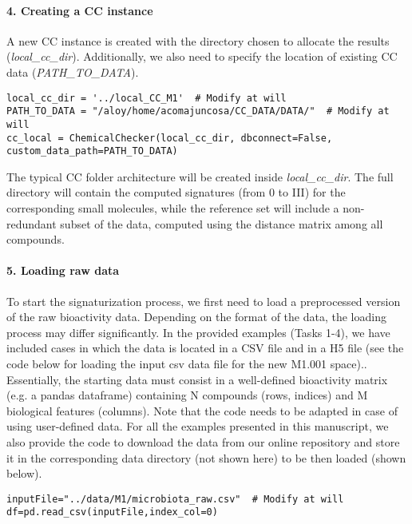 \paragraph{4. Creating a CC instance} \leavevmode

A new CC instance is created with the directory chosen to allocate the results (\textit{local\_cc\_dir}). Additionally, we also need to specify the location of existing CC data (\textit{PATH\_TO\_DATA}). \\

\begin{lstlisting}
local_cc_dir = '../local_CC_M1'  # Modify at will
PATH_TO_DATA = "/aloy/home/acomajuncosa/CC_DATA/DATA/"  # Modify at will
cc_local = ChemicalChecker(local_cc_dir, dbconnect=False, custom_data_path=PATH_TO_DATA)
\end{lstlisting}

The typical CC folder architecture will be created inside \textit{local\_cc\_dir}. The full directory will contain the computed signatures (from 0 to III) for the corresponding small molecules, while the reference set will include a non-redundant subset of the data, computed using the distance matrix among all compounds.

\paragraph{5. Loading raw data} \leavevmode

To start the signaturization process, we first need to load a preprocessed version of the raw bioactivity data. Depending on the format of the data, the loading process may differ significantly. In the provided examples (Tasks 1-4), we have included cases in which the data is located in a CSV file and in a H5 file (see the code below for loading the input csv data file for the new M1.001 space).. Essentially, the starting data must consist in a well-defined bioactivity matrix (e.g. a pandas dataframe) containing N compounds (rows, indices) and M biological features (columns). Note that the code needs to be adapted in case of using user-defined data. For all the examples presented in this manuscript, we also provide the code to download the data from our online repository and store it in the corresponding data directory (not shown here) to be then loaded (shown below). \\

\begin{lstlisting}
inputFile="../data/M1/microbiota_raw.csv"  # Modify at will
df=pd.read_csv(inputFile,index_col=0)
\end{lstlisting}

